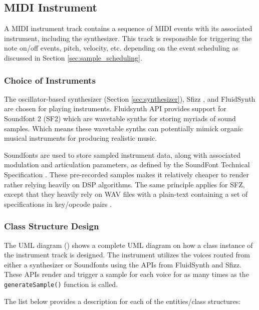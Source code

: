\subsection{MIDI Instrument}
\label{sec:midi_track}

A MIDI instrument track contains a sequence of MIDI events with its associated
instrument, including the synthesizer. This track is responsible for triggering the note on/off
events, pitch, velocity, etc. depending on the event scheduling as discussed in Section \ref{sec:sample_scheduling}.

\subsubsection{Choice of Instruments}

The oscillator-based synthesizer (Section \ref{sec:synthesizer}), Sfizz \cite{sfizz}, and FluidSynth \cite{fluidsynth} are chosen for playing instruments. 
Fluidsynth API provides support for Soundfont 2 (SF2) which are wavetable synths for storing myriads of sound samples. Which means these wavetable
synths can potentially mimick organic musical instruments for producing realistic music.

Soundfonts are used to store sampled instrument data, along with associated modulation and articulation parameters, 
as defined by the SoundFont Technical Specification \cite{soundfont_spec}. These pre-recorded samples makes it relatively cheaper to render
rather relying heavily on DSP algorithms. The same principle applies for SFZ, except that they heavily rely on WAV files 
with a plain-text containing a set of specifications in key/opcode pairs \cite{sfz_format}. 

\subsubsection{Class Structure Design}
The UML diagram () shows a complete UML diagram on how a class instance of the instrument track is designed.
The instrument utilizes the voices routed from either a synthesizer or Soundfonts using the APIs from FluidSynth and Sfizz. These 
APIs render and trigger a sample for each voice for as many times as the \texttt{generateSample()} function is called.



The list below provides a description for each of the entities/class structures:

